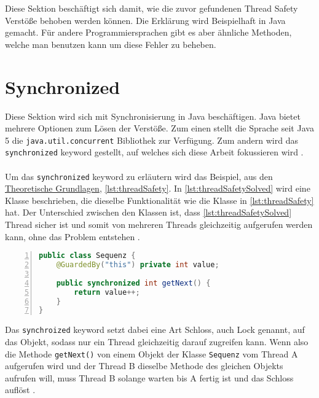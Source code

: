 \label{sec:loesen}

Diese Sektion beschäftigt sich damit, wie die zuvor gefundenen Thread Safety Verstöße behoben werden können. Die Erklärung wird Beispielhaft in Java gemacht. Für andere Programmiersprachen gibt es aber ähnliche Methoden, welche man benutzen kann um diese Fehler zu beheben.

\section{Synchronized}

 Diese Sektion wird sich mit Synchronisierung in Java beschäftigen. Java bietet mehrere Optionen zum Lösen der Verstöße. Zum einen stellt die Sprache seit Java 5 die \texttt{java.util.concurrent} Bibliothek zur Verfügung. Zum andern wird das \texttt{synchronized} keyword gestellt, auf welches sich diese Arbeit fokussieren wird \cite[vgl.][121]{fekete_teaching_nodate}. \\
\\
 Um das \texttt{synchronized} keyword zu erläutern wird das Beispiel, aus den \hyperref[sec:threads]{Theoretische Grundlagen}, \ref{lst:threadSafety}. In \ref{lst:threadSafetySolved} wird eine Klasse beschrieben, die dieselbe Funktionalität wie die Klasse in \ref{lst:threadSafety} hat. Der Unterschied zwischen den Klassen ist, dass \ref{lst:threadSafetySolved} Thread sicher ist und somit von mehreren Threads gleichzeitig aufgerufen werden kann, ohne das Problem entstehen \cite[vgl.][5-6]{brian}. 
\\
 \begin{lstlisting}[language=Java,frame=tb,caption={Thread-safe Sequence Generator \cite{brian}}, label={lst:threadSafetySolved}, numbers=left, stepnumber=1, captionpos=b, tabsize=4]
public class Sequenz {
	@GuardedBy("this") private int value;

	public synchronized int getNext() {
		return value++;
	}
}
\end{lstlisting}

\noindent
Das \texttt{synchroized} keyword setzt dabei eine Art Schloss, auch Lock genannt, auf das Objekt, sodass nur ein Thread gleichzeitig darauf zugreifen kann. Wenn also die Methode \texttt{getNext()} von einem Objekt der Klasse \texttt{Sequenz} vom Thread A aufgerufen wird und der Thread B dieselbe Methode des gleichen Objekts aufrufen will, muss Thread B solange warten bis A fertig ist und das Schloss auflöst \cite[vgl.][17]{brian}.



